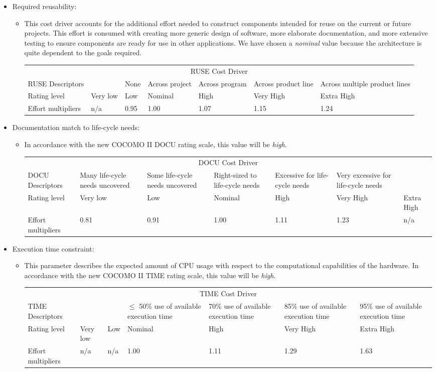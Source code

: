 \documentclass[english]{article}
\newenvironment{costdriverstable}[1]{
	\setlength{\LTleft}{-40pt}
	\begin{longtable}{|p{\dimexpr.16\textwidth}|p{\dimexpr.14\textwidth}|p{\dimexpr.14\textwidth}|p{\dimexpr.14\textwidth}|p{\dimexpr.14\textwidth}|p{\dimexpr.14\textwidth}|p{\dimexpr.14\textwidth}|}
	\hline
	\multicolumn{7}{|c|}{{#1}}\\\hhline{|=======|}
}{
	\hline\end{longtable}
}
\newcommand{\costdescriptors}[7]{
	#1 & #2 & #3 & #4 & #5 & #6 & #7\\
}
\newcommand{\ratinglevel}[6]{
	Rating level & #1 & #2 & #3 & #4 & #5 & #6 \\\hline
}
\newcommand{\effortmultipliers}[6]{
	Effort multipliers & #1 & #2 & #3 & #4 & #5 & #6 \\\hline
}
\begin{document}
\begin{itemize}
	\item Required reusability: 
	\begin{itemize}
	\item[] This cost driver accounts for the additional effort needed to construct components intended for reuse on the current or future projects. This effort is consumed with creating more generic design of software, more elaborate documentation, and more extensive testing to ensure components are ready for use in other applications.
We have chosen a \textit{nominal} value because the architecture is quite dependent to the goals required.
	\begin{costdriverstable}{RUSE Cost Driver}
		\costdescriptors{RUSE Descriptors}{}{None}{Across project}{Across program}{Across product line}{Across multiple product lines}\hline
		\ratinglevel{Very low}{Low}{Nominal}{High}{Very High}{Extra High}
		\effortmultipliers{n/a}{0.95}{1.00}{1.07}{1.15}{1.24}		
	\end{costdriverstable}
	\end{itemize}
\end{itemize}

\begin{itemize}
	\item Documentation match to life-cycle needs: 
	\begin{itemize}
	\item[] In accordance with the new COCOMO II DOCU rating scale, this value will be \textit{high}.
	\begin{costdriverstable}{DOCU Cost Driver}
		\costdescriptors{DOCU Descriptors}{Many life-cycle needs uncovered}{Some life-cycle needs uncovered}{Right-sized to life-cycle needs}{Excessive for life-cycle needs}{Very excessive for life-cycle needs}{}\hline
		\ratinglevel{Very low}{Low}{Nominal}{High}{Very High}{Extra High}
		\effortmultipliers{0.81}{0.91}{1.00}{1.11}{1.23}{n/a}		
	\end{costdriverstable}
	\end{itemize}
\end{itemize}

\begin{itemize}
	\item Execution time constraint: 
	\begin{itemize}
	\item[] This parameter describes the expected amount of CPU usage with respect to the computational capabilities of the hardware. In accordance with the new COCOMO II TIME rating scale, this value will be \textit{high}.
	\begin{costdriverstable}{TIME Cost Driver}
		\costdescriptors{TIME Descriptors}{}{}{$\le$ 50\% use of available execution time}{70\% use of available execution time}{85\% use of available execution time} {95\% use of available execution time}\hline
		\ratinglevel{Very low}{Low}{Nominal}{High}{Very High}{Extra High}
		\effortmultipliers{n/a}{n/a}{1.00}{1.11}{1.29}{1.63}	
	\end{costdriverstable}
	\end{itemize}
\end{itemize}
\end{document}
